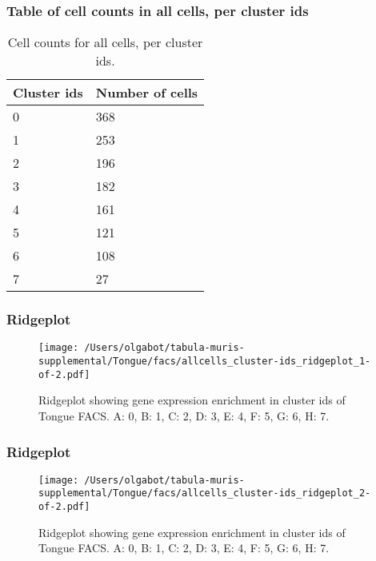 \subsubsection{Table of cell counts in all cells, per cluster ids}\begin{table}[h]
\centering
\label{my-label}
\begin{tabular}{@{}ll@{}}
\toprule

Cluster ids& Number of cells \\ \midrule
0 & 368 \\

1 & 253 \\

2 & 196 \\

3 & 182 \\

4 & 161 \\

5 & 121 \\

6 & 108 \\

7 & 27 \\
\bottomrule
\end{tabular}
\caption{Cell counts for all cells, per cluster ids.}
\end{table}

\newpage
\subsubsection{Ridgeplot}
\begin{figure}[h]
\centering
\texttt{[image: /Users/olgabot/tabula-muris-supplemental/Tongue/facs/allcells\_cluster-ids\_ridgeplot\_1-of-2.pdf]}

\caption{ Ridgeplot  showing gene expression enrichment in cluster ids of Tongue FACS. A: 0, B: 1, C: 2, D: 3, E: 4, F: 5, G: 6, H: 7.}
\end{figure}


\newpage
\newpage
\subsubsection{Ridgeplot}
\begin{figure}[h]
\centering
\texttt{[image: /Users/olgabot/tabula-muris-supplemental/Tongue/facs/allcells\_cluster-ids\_ridgeplot\_2-of-2.pdf]}

\caption{ Ridgeplot  showing gene expression enrichment in cluster ids of Tongue FACS. A: 0, B: 1, C: 2, D: 3, E: 4, F: 5, G: 6, H: 7.}
\end{figure}


